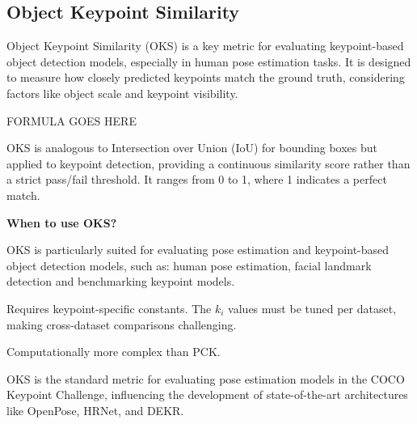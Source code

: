 \subsection{Object Keypoint Similarity}

Object Keypoint Similarity (OKS) is a key metric for evaluating keypoint-based object detection models, especially in human
pose estimation tasks. It is designed to measure how closely predicted keypoints match the ground truth, considering factors
like object scale and keypoint visibility.

\begin{center}
    FORMULA GOES HERE
\end{center}

OKS is analogous to Intersection over Union (IoU) for bounding boxes but applied to keypoint detection, providing a continuous
similarity score rather than a strict pass/fail threshold. It ranges from 0 to 1, where 1 indicates a perfect match.

\textbf{When to use OKS?}

OKS is particularly suited for evaluating pose estimation and keypoint-based object detection models, such as: human pose
estimation, facial landmark detection and benchmarking keypoint models.


{
\item Requires keypoint-specific constants. The $k_i$ values must be tuned per dataset, making cross-dataset comparisons
challenging.
\item Computationally more complex than PCK.
}

\clearpage
{}
{OKS is the standard metric for evaluating pose estimation models in the COCO Keypoint Challenge, influencing the development
of state-of-the-art architectures like OpenPose, HRNet, and DEKR.}


\clearpage
\thispagestyle{cvstyle}
